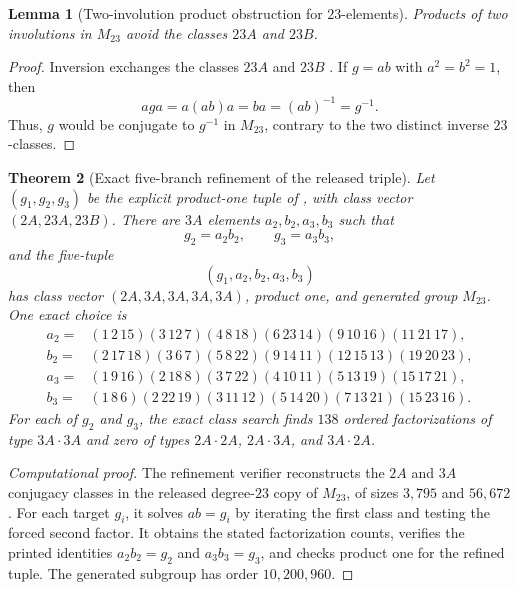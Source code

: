 \documentclass[11pt]{article}
\newtheorem{theorem}{Theorem}[section]
\newtheorem{lemma}[theorem]{Lemma}
\theoremstyle{remark}
\begin{document}
\begin{lemma}[Two-involution product obstruction for $23$-elements]\label{lem:two-involution-obstruction}
Products of two involutions in $M_{23}$ avoid the classes $23A$ and $23B$.
\end{lemma}

\begin{proof}
Inversion exchanges the classes $23A$ and $23B$ \cite{Atlas,HuangEtAl}.  If $g=ab$ with $a^2=b^2=1$, then
\[
 aga=a(ab)a=ba=(ab)^{-1}=g^{-1}.
\]
Thus, $g$ would be conjugate to $g^{-1}$ in $M_{23}$, contrary to the two distinct inverse $23$-classes.
\end{proof}

\begin{theorem}[Exact five-branch refinement of the released triple]\label{thm:three-five-refinement}
Let $(g_1,g_2,g_3)$ be the explicit product-one tuple of \cite{HuangEtAl}, with class vector $(2A,23A,23B)$.  There are $3A$ elements $a_2,b_2,a_3,b_3$ such that
\[
 g_2=a_2b_2,
 \qquad
 g_3=a_3b_3,
\]
and the five-tuple
\[
 (g_1,a_2,b_2,a_3,b_3)
\]
has class vector $(2A,3A,3A,3A,3A)$, product one, and generated group $M_{23}$.  One exact choice is
\begin{align*}
 a_2={}&(1\,2\,15)(3\,12\,7)(4\,8\,18)(6\,23\,14)(9\,10\,16)(11\,21\,17),\\
 b_2={}&(2\,17\,18)(3\,6\,7)(5\,8\,22)(9\,14\,11)(12\,15\,13)(19\,20\,23),\\
 a_3={}&(1\,9\,16)(2\,18\,8)(3\,7\,22)(4\,10\,11)(5\,13\,19)(15\,17\,21),\\
 b_3={}&(1\,8\,6)(2\,22\,19)(3\,11\,12)(5\,14\,20)(7\,13\,21)(15\,23\,16).
\end{align*}
For each of $g_2$ and $g_3$, the exact class search finds $138$ ordered factorizations of type $3A\cdot3A$ and zero of types $2A\cdot2A$, $2A\cdot3A$, and $3A\cdot2A$.
\end{theorem}

\begin{proof}[Computational proof]
The refinement verifier reconstructs the $2A$ and $3A$ conjugacy classes in the released degree-$23$ copy of $M_{23}$, of sizes $3{,}795$ and $56{,}672$.  For each target $g_i$, it solves $ab=g_i$ by iterating the first class and testing the forced second factor.  It obtains the stated factorization counts, verifies the printed identities $a_2b_2=g_2$ and $a_3b_3=g_3$, and checks product one for the refined tuple.  The generated subgroup has order $10{,}200{,}960$.
\end{proof}
\end{document}
